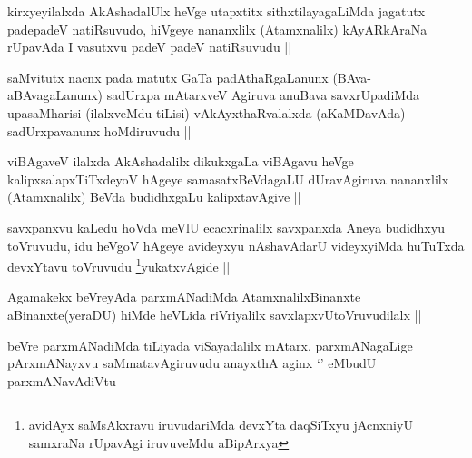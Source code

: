 
\begin{artha}
kirxyeyilalxda AkAshadalUlx heVge utapxtitx sithxtilayagaLiMda
jagatutx padepadeV natiRsuvudo, hiVgeye nananxlilx (Atamxnalilx)
kAyARkAraNa rUpavAda I vasutxvu padeV padeV natiRsuvudu ||
\end{artha}


\begin{artha}
saMvitutx nacnx pada matutx GaTa padAthaRgaLanunx (BAva-aBAvagaLanunx)
sadUrxpa mAtarxveV Agiruva anuBava savxrUpadiMda upasaMharisi
(ilalxveMdu tiLisi) vAkAyxthaRvalalxda (aKaMDavAda) sadUrxpavanunx
hoMdiruvudu ||
\end{artha}


\begin{artha}
viBAgaveV ilalxda AkAshadalilx dikukxgaLa viBAgavu heVge
kalipxsalapxTiTxdeyoV hAgeye samasatxBeVdagaLU dUravAgiruva nananxlilx
(Atamxnalilx) BeVda budidhxgaLu kalipxtavAgive ||
\end{artha}


\begin{artha}
savxpanxvu kaLedu hoVda meVlU ecacxrinalilx savxpanxda Aneya budidhxyu
toVruvudu, idu heVgoV hAgeye avideyxyu nAshavAdarU videyxyiMda
huTuTxda devxYtavu toVruvudu \footnote[1]{avidAyx saMsAkxravu
  iruvudariMda devxYta daqSiTxyu jAcnxniyU samxraNa rUpavAgi
  iruvuveMdu aBipArxya}yukatxvAgide ||
\end{artha}


\begin{artha}
Agamakekx beVreyAda parxmANadiMda AtamxnalilxBinanxte
aBinanxte(yeraDU) hiMde heVLida riVriyalilx savxlapxvUtoVruvudilalx ||
\end{artha}


\begin{artha}
beVre parxmANadiMda tiLiyada viSayadalilx mAtarx, parxmANagaLige
pArxmANayxvu saMmatavAgiruvudu anayxthA aginx `\stext' eMbudU
parxmANavAdiVtu  
\end{artha}

